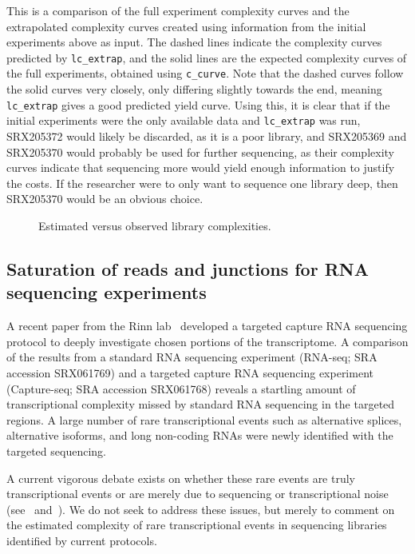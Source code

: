 \documentclass[11pt, titlepage]{article}
\newcommand{\fn}[1]{\texttt{#1}}
\begin{document}
This is a comparison of the full experiment complexity curves and the extrapolated complexity curves created using information from the initial experiments above as input. The dashed lines indicate the complexity curves predicted by \fn{lc\_extrap}, and the solid lines are the expected complexity curves of the full experiments, obtained using \fn{c\_curve}. Note that the dashed curves follow the solid curves very closely, only differing slightly towards the end, meaning \fn{lc\_extrap} gives a good predicted yield curve.  Using this, it is clear that if the initial experiments were the only available data and \fn{lc\_extrap} was run, SRX205372 would likely be discarded, as it is a poor library, and SRX205369 and SRX205370 would probably be used for further sequencing, as their complexity curves indicate that sequencing more would yield enough information to justify the costs.  If the researcher were to only want to sequence one library deep, then SRX205370 would be an obvious choice.
\newline
\newline
\begin{figure}[h!]
\centering
{}
\caption{Estimated versus observed library complexities.}
\end{figure}


\newpage


\subsection*{Saturation of reads and junctions for RNA sequencing experiments}

A recent paper from the Rinn lab~\cite{mercer2011targeted}
developed a targeted capture RNA sequencing
protocol to deeply investigate chosen portions of the transcriptome.
A comparison of the results from a standard RNA sequencing
experiment (RNA-seq; SRA accession SRX061769) and a targeted capture RNA sequencing
experiment (Capture-seq; SRA accession SRX061768) reveals
a startling amount of transcriptional complexity missed by standard
RNA sequencing in the targeted regions.  A large number of
rare transcriptional events such as alternative splices, alternative isoforms,
and long non-coding RNAs were newly identified with the targeted sequencing.

A current vigorous debate exists on whether these rare events are truly transcriptional
events or are merely due to sequencing or transcriptional noise
(see~\cite{van2010most} and~\cite{clark2011reality}).  We do not seek to address
these issues, but merely to comment on the estimated complexity
of rare transcriptional events in sequencing libraries identified by current
protocols.
\end{document}
